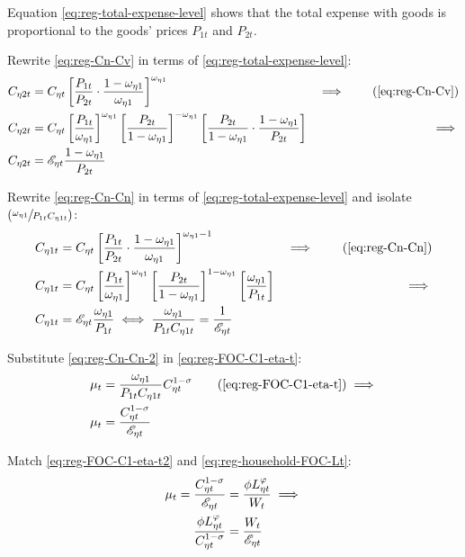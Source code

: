 \documentclass[../thesis.tex]{subfiles}
\begin{document}
Equation \ref{eq:reg-total-expense-level} shows that the total expense with goods is proportional to the goods' prices $P_{1 t}$ and $P_{2 t}$.

Rewrite \ref{eq:reg-Cn-Cv} in terms of \ref{eq:reg-total-expense-level}:
\begin{alignat}{2}
	C_{\eta 2 t} &= C_{\eta t} \left[ \frac{P_{1 t}}{P_{2 t}} \cdot \frac{1 -\omega_{\eta 1}}{\omega_{\eta 1}} \right]^{\omega_{\eta 1}} &\implies \tag{\ref{eq:reg-Cn-Cv}} \\
	C_{\eta 2 t} &= C_{\eta t} \left[ \frac{P_{1 t}}{\omega_{\eta 1}} \right]^{\omega_{\eta 1}} \left[ \frac{P_{2 t}}{1 -\omega_{\eta 1}} \right]^{-\omega_{\eta 1}} \left[ \frac{P_{2 t}}{1 -\omega_{\eta 1}} \cdot \frac{1 -\omega_{\eta 1}}{P_{2 t}} \right] &\implies \nonumber \\
	C_{\eta 2 t} &= \te \frac{1 -\omega_{\eta 1}}{P_{2 t}} \label{eq:reg-Cn-Cv-2}
\end{alignat}

Rewrite \ref{eq:reg-Cn-Cn} in terms of \ref{eq:reg-total-expense-level} and isolate $(\sfrac{\omega_{\eta 1}}{P_{1 t} C_{\eta 1 t}})$:
	\begin{alignat}{2}
		C_{\eta 1 t} &= C_{\eta t} \left[ \frac{P_{1 t}}{P_{2 t}} \cdot \frac{1 -\omega_{\eta 1}}{\omega_{\eta 1}} \right]^{\omega_{\eta 1} -1} &\implies \tag{\ref{eq:reg-Cn-Cn}} \\
		C_{\eta 1 t} &= C_{\eta t} \left[ \frac{ P_{1 t}}{ \omega_{\eta 1}}\right]^{ \omega_{\eta 1}} \left[ \frac{P_{2 t}}{1-\omega_{\eta 1}} \right]^{1 -\omega_{\eta 1}} \left[ \frac{\omega_{\eta 1}}{P_{1 t}} \right] &\implies \nonumber \\
		C_{\eta 1 t} &= \te \frac{\omega_{\eta 1}}{P_{1 t}} \iff
		\frac{\omega_{\eta 1}}{P_{1 t} C_{\eta 1 t}} = \frac{1}{\te} \label{eq:reg-Cn-Cn-2}
	\end{alignat}

Substitute \ref{eq:reg-Cn-Cn-2} in \ref{eq:reg-FOC-C1-eta-t}:
\begin{align}
	\mu_t &= \frac{\omega_{\eta 1}}{P_{1 t} C_{\eta 1 t}} C_{\eta t}^{1 -\sigma} \tag{\ref{eq:reg-FOC-C1-eta-t}} \implies \\
	\mu_t &= \frac{ C_{\eta t}^{1-\sigma}}{ \te}  \label{eq:reg-FOC-C1-eta-t2}
\end{align}

Match \ref{eq:reg-FOC-C1-eta-t2} and \ref{eq:reg-household-FOC-Lt}:
\begin{align}
	\mu_t = \frac{ C_{\eta t}^{1-\sigma}}{ {\mathscr{E}_{\eta t}}} &= \frac{\phi L_{\eta t}^{\varphi}}{W_t} \implies \nonumber \\
	\frac{\phi L_{\eta t}^{\varphi}}{C_{\eta t}^{1-\sigma}} &= \frac{W_t}{{\mathscr{E}_{\eta t}}} \label{eq:reg-labor-supply}
\end{align}
\end{document}
